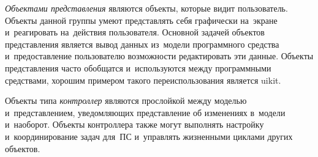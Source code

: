 \emph{Объектами представления} являются объекты, которые видит пользователь. Объекты данной группы умеют представлять себя графически на~экране и~реагировать на~действия пользователя. Основной задачей объектов представления является вывод данных из~модели программного средства и~предоставление пользователю возможности редактировать эти данные. Объекты представления часто обобщатся и~используются между программными средствами, хорошим примером такого переиспользования является \gls{uikit}. 

Объекты типа \emph{контроллер} являются прослойкой между моделью и~представлением, уведомляющих представление об изменениях в~модели и~наоборот. Объекты контроллера также могут выполнять настройку и~координирование задач для~ПС и~управлять жизненными циклами других объектов. 